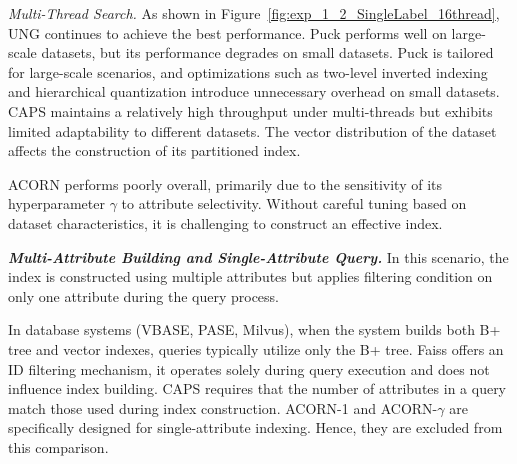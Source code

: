 \documentclass[sigconf, nonacm]{acmart}
\begin{document}
\textit{Multi-Thread Search.}
As shown in Figure~\ref{fig:exp_1_2_SingleLabel_16thread}, UNG continues to achieve the best performance. Puck performs well on large-scale datasets, but its performance degrades on small datasets. Puck is tailored for large-scale scenarios, and optimizations such as two-level inverted indexing and hierarchical quantization introduce unnecessary overhead on small datasets. 
CAPS maintains a relatively high throughput under multi-threads but exhibits limited adaptability to different datasets. The vector distribution of the dataset affects the construction of its partitioned index.

ACORN performs poorly overall, primarily due to the sensitivity of its hyperparameter $\gamma$ to attribute selectivity. Without careful tuning based on dataset characteristics, it is challenging to construct an effective index.

\textit{\textbf{Multi-Attribute Building and Single-Attribute Query.}}
In this scenario, the index is constructed using multiple attributes but applies filtering condition on only one attribute during the query process.

In database systems (VBASE, PASE, Milvus), when the system builds both B+ tree and vector indexes, queries typically utilize only the B+ tree. Faiss offers an ID filtering mechanism, it operates solely during query execution and does not influence index building. CAPS requires that the number of attributes in a query match those used during index construction. ACORN-1 and ACORN-\(\gamma\) are specifically designed for single-attribute indexing. Hence, they are excluded from this comparison.
\end{document}
